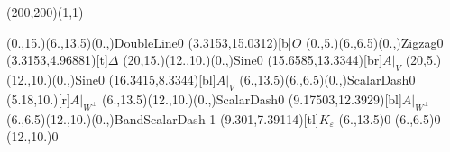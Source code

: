 \unitlength=1bp%

\begin{feynartspicture}(200,200)(1,1)

\FADiagram{}
\FAProp(0.,15.)(6.,13.5)(0.,){DoubleLine}{0}
\FALabel(3.3153,15.0312)[b]{$O$}
\FAProp(0.,5.)(6.,6.5)(0.,){Zigzag}{0}
\FALabel(3.3153,4.96881)[t]{$\Delta$}
\FAProp(20,15.)(12.,10.)(0.,){Sine}{0}
\FALabel(15.6585,13.3344)[br]{$A|_V$}
\FAProp(20,5.)(12.,10.)(0.,){Sine}{0}
\FALabel(16.3415,8.3344)[bl]{$A|_V$}
\FAProp(6.,13.5)(6.,6.5)(0.,){ScalarDash}{0}
\FALabel(5.18,10.)[r]{$A|_{W^\perp}$}
\FAProp(6.,13.5)(12.,10.)(0.,){ScalarDash}{0}
\FALabel(9.17503,12.3929)[bl]{$A|_{W^\perp}$}
\FAProp(6.,6.5)(12.,10.)(0.,){BandScalarDash}{-1}
\FALabel(9.301,7.39114)[tl]{$K_\varepsilon$}
\FAVert(6.,13.5){0}
\FAVert(6.,6.5){0}
\FAVert(12.,10.){0}
\end{feynartspicture}

